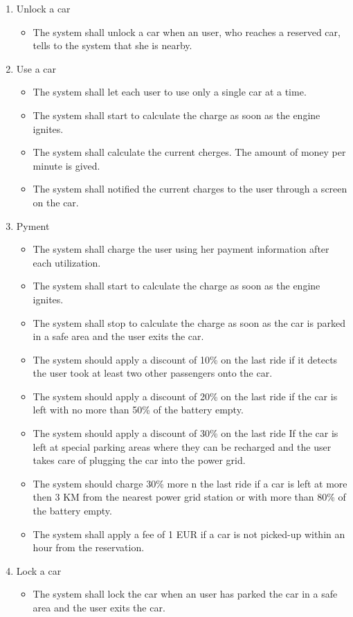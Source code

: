 \begin{itemize}
\begin{enumerate}
	\item Unlock a car
	\begin{itemize}
	\item The system shall unlock a car when an user, who reaches a reserved car, tells to the system that she is nearby.
	\end{itemize}


	\item Use a car
	\begin{itemize}
	\item The system shall let each user to use only a single car at a time.
	\item The system shall start to calculate the charge as soon as the engine ignites.
	\item The system shall calculate the current cherges. The amount of money per minute is gived.
	\item The system shall notified the current charges to the user through a screen on the car.
	\end{itemize}
	
	\item Pyment
	\begin{itemize}
	\item The system shall charge the user using her payment information after each utilization.
	\item The system shall start to calculate the charge as soon as the engine ignites.
	\item The system shall stop to calculate the charge as soon as the car is parked in a safe area and the user exits the car.%
	\item The system should apply a discount of 10\% on the last ride if it detects the user took at least two other passengers onto the car.
	\item The system should apply a discount of 20\% on the last ride if the car is left with no more than 50\% of the battery empty.
	\item The system should apply a discount of 30\% on the last ride If the car is left at special parking areas where they can be recharged and the user takes care of plugging the car into the power grid.
	\item The system should charge 30\% more n the last ride if a car is left at more then 3 KM  from the nearest power grid station or with more than 80\% of the battery empty.
	\item The system shall apply a fee of 1 EUR if a car is not picked-up within an hour from the reservation.
	\end{itemize}

	\item Lock a car
	\begin{itemize}
	\item The system shall lock the car when an user has parked the car in a safe area and the user exits the car. 
	\end{itemize}

\end{enumerate}

\end{itemize}




